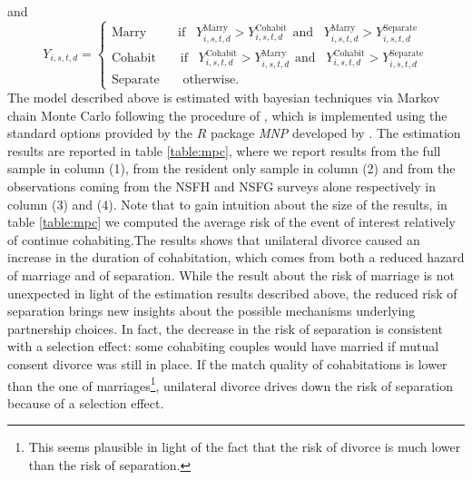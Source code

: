 \documentclass[12pt]{article}
\numberwithin{table}{section}
\begin{document}
and
\begin{equation}\label{eq:probit_outcome}
Y_{i,s,t,d}=
\begin{cases}  	
\text{Marry}\hspace{30pt}       \text{if}\hspace{10pt}Y_{i,s,t,d}^\text{Marry}>Y_{i,s,t,d}^\text{Cohabit}\hspace{5pt}\text{and}\hspace{5pt}\hspace{5pt}Y_{i,s,t,d}^\text{Marry}>Y_{i,s,t,d}^\text{Separate}\\
\text{Cohabit}\hspace{23pt}   \text{if}\hspace{10pt}Y_{i,s,t,d}^\text{Cohabit}>Y_{i,s,t,d}^\text{Marry}\hspace{5pt}\text{and}\hspace{5pt}\hspace{5pt}Y_{i,s,t,d}^\text{Cohabit}>Y_{i,s,t,d}^\text{Separate}\\
\text{Separate}\hspace{22pt}     \text{otherwise.}
\end{cases}
\end{equation}
The model described above is estimated with bayesian techniques via Markov chain Monte Carlo following the procedure of \cite{imai2005a}, which is implemented using the standard options provided by the $R$ package \textit{MNP} developed by \cite{imai2005b}. The estimation results are reported in table \ref{table:mpc}, where we report results from the full sample in column (1), from the resident only sample in column (2) and from the observations coming from the NSFH and NSFG surveys alone respectively in column (3) and (4). Note that to gain intuition about the size of the results, in  table \ref{table:mpc} we computed the average risk of the event of interest relatively of continue cohabiting.The results shows that unilateral divorce caused an increase in the duration of cohabitation, which comes from both a reduced hazard of marriage and of separation. While the result about the risk of marriage is not unexpected in light of the estimation results described above, the reduced risk of separation brings new insights about the possible mechanisms underlying partnership choices. In fact, the decrease in the risk of separation is consistent with a selection effect: some cohabiting couples would have married if mutual consent divorce was still in place. If the match quality of cohabitations is lower than the one of marriages\footnote{This seems plausible in light of the fact that the risk of divorce is much lower than the risk of separation.}, unilateral divorce drives down the risk of separation because of a selection effect. 
\end{document}
